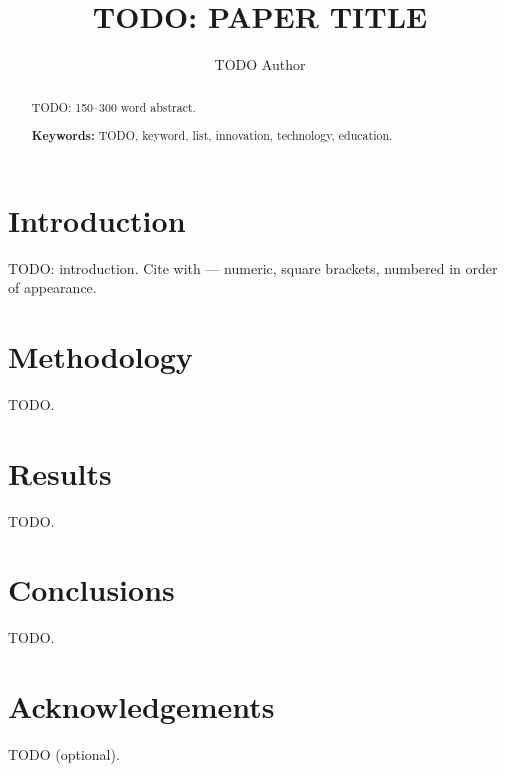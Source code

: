 \documentclass[a4paper,11pt]{article}
\title{\textbf{TODO: PAPER TITLE}}
\author[1]{TODO Author}
\affil[1]{TODO University (COUNTRY)}
\date{}
\begin{document}
\maketitle

\begin{abstract}
\noindent TODO: 150--300 word abstract. %

\smallskip\noindent\textbf{Keywords:} TODO, keyword, list, innovation, technology, education.
\end{abstract}

\section{Introduction}
TODO: introduction. Cite with \cite{example2024} — numeric, square brackets,
numbered in order of appearance.

\section{Methodology}
TODO.

\section{Results}
TODO.

\section{Conclusions}
TODO.

\section*{Acknowledgements}
TODO (optional).



\end{document}
